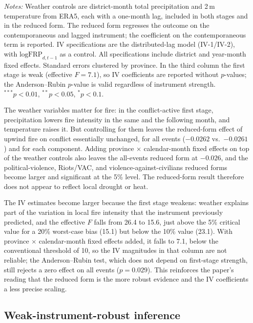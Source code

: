 \documentclass[12pt]{article}
\begin{document}
\begin{table}[H]
\begin{minipage}{0.95\textwidth}
\footnotesize \emph{Notes:} Weather controls are district-month total precipitation and 2\,m temperature from ERA5, each with a one-month lag, included in both stages and in the reduced form. The reduced form regresses the outcome on the contemporaneous and lagged instrument; the coefficient on the contemporaneous term is reported. IV specifications are the distributed-lag model (IV-1/IV-2), with $\text{logFRP}_{d,t-1}$ as a control. All specifications include district and year-month fixed effects. Standard errors clustered by province. In the third column the first stage is weak (effective $F = 7.1$), so IV coefficients are reported without $p$-values; the Anderson--Rubin $p$-value is valid regardless of instrument strength. $^{***}p<0.01$, $^{**}p<0.05$, $^{*}p<0.1$.
\end{minipage}
\end{table}

The weather variables matter for fire: in the conflict-active first stage, precipitation lowers fire intensity in the same and the following month, and temperature raises it. But controlling for them leaves the reduced-form effect of upwind fire on conflict essentially unchanged, for all events ($-0.0262$ vs.\ $-0.0261$) and for each component. Adding province $\times$ calendar-month fixed effects on top of the weather controls also leaves the all-events reduced form at $-0.026$, and the political-violence, Riots/VAC, and violence-against-civilians reduced forms become larger and significant at the 5\% level. The reduced-form result therefore does not appear to reflect local drought or heat.

The IV estimates become larger because the first stage weakens: weather explains part of the variation in local fire intensity that the instrument previously predicted, and the effective $F$ falls from 26.4 to 15.6, just above the 5\% critical value for a 20\% worst-case bias (15.1) but below the 10\% value (23.1). With province $\times$ calendar-month fixed effects added, it falls to 7.1, below the conventional threshold of 10, so the IV magnitudes in that column are not reliable; the Anderson--Rubin test, which does not depend on first-stage strength, still rejects a zero effect on all events ($p=0.029$). This reinforces the paper's reading that the reduced form is the more robust evidence and the IV coefficients a less precise scaling.

\subsection{Weak-instrument-robust inference}
\label{sec:ar}
\end{document}
